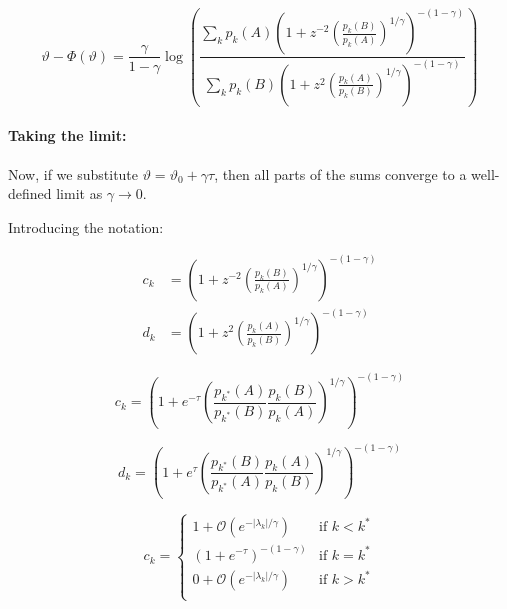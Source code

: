 \documentclass{article}
\theoremstyle{definition}
\begin{document}
\begin{equation}
    \vartheta - \Phi(\vartheta) = 
    \frac{\gamma}{1-\gamma} \log \left (
    \frac{
    \sum_k p_k(A) \left (1 + z^{-2} \left ( \frac{p_k(B)}{p_k(A)} \right )^{1/\gamma} \right )^{-(1-\gamma)}
    }
    {
    \sum_k p_k(B) \left ( 1 + z^{2} \left ( \frac{p_k(A)}{p_k(B)} \right )^{1/\gamma} \right )^{-(1-\gamma)}
    }
    \right )
\end{equation}

\paragraph{Taking the limit:}

Now, if we substitute $\vartheta = \vartheta_0 + \gamma \tau$, then all parts of the sums converge to a well-defined limit as $\gamma \to 0$.

Introducing the notation:

\begin{equation}
    \begin{split}
        c_k &= \left (1 + z^{-2} \left ( \frac{p_k(B)}{p_k(A)} \right )^{1/\gamma} \right )^{-(1-\gamma)} \\
        d_k &= \left ( 1 + z^{2} \left ( \frac{p_k(A)}{p_k(B)} \right )^{1/\gamma} \right )^{-(1-\gamma)}
    \end{split}
\end{equation}


\begin{equation}
    c_k =  \left (1 + e^{-\tau} \left ( \frac{p_{k^*}(A)}{p_{k^*}(B)} \frac{p_k(B)}{p_k(A)} \right )^{1/\gamma} \right )^{-(1-\gamma)}
\end{equation}


\begin{equation}
    d_k =  \left (1 + e^{\tau} \left ( \frac{p_{k^*}(B)}{p_{k^*}(A)} \frac{p_k(A)}{p_k(B)} \right )^{1/\gamma} \right )^{-(1-\gamma)}
\end{equation}


\begin{equation}
    c_k = 
    \begin{cases}
        1 + \mathcal{O}(e^{-|\lambda_k|/\gamma}) & \text{if } k < k^* \\
        \left (1 + e^{-\tau} \right )^{-(1-\gamma)} & \text{if } k=k^* \\
        0 + \mathcal{O}(e^{-|\lambda_k|/\gamma}) & \text{if } k > k^* \\
\end{cases}
\end{equation}
\end{document}
